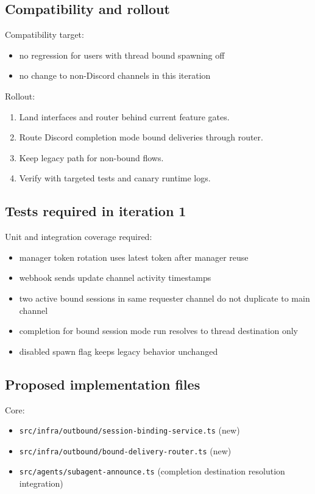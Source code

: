 \subsection{Compatibility and rollout}


Compatibility target:

\begin{itemize}
  \item no regression for users with thread bound spawning off
  \item no change to non-Discord channels in this iteration
\end{itemize}


Rollout:

\begin{enumerate}
  \item Land interfaces and router behind current feature gates.
  \item Route Discord completion mode bound deliveries through router.
  \item Keep legacy path for non-bound flows.
  \item Verify with targeted tests and canary runtime logs.
\end{enumerate}


\subsection{Tests required in iteration 1}


Unit and integration coverage required:

\begin{itemize}
  \item manager token rotation uses latest token after manager reuse
  \item webhook sends update channel activity timestamps
  \item two active bound sessions in same requester channel do not duplicate to main channel
  \item completion for bound session mode run resolves to thread destination only
  \item disabled spawn flag keeps legacy behavior unchanged
\end{itemize}


\subsection{Proposed implementation files}


Core:

\begin{itemize}
  \item \texttt{src/infra/outbound/session-binding-service.ts} (new)
  \item \texttt{src/infra/outbound/bound-delivery-router.ts} (new)
  \item \texttt{src/agents/subagent-announce.ts} (completion destination resolution integration)
\end{itemize}


